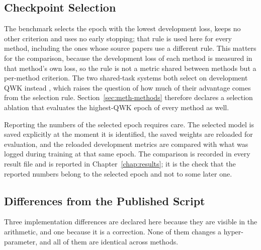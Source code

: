 \subsection{Checkpoint Selection}

The benchmark selects the epoch with the lowest development loss, keeps no other criterion and
uses no early stopping; that rule is used here for every method, including the ones whose
source papers use a different rule. This matters for the comparison, because the development
loss of each method is measured in that method's own loss, so the rule is not a metric shared
between methods but a per-method criterion. The two shared-task systems both select on
development QWK instead \cite{nazzal2025zai,trigui2025stbw}, which raises the question of how
much of their advantage comes from the selection rule. Section~\ref{sec:meth-methods} therefore
declares a selection ablation that evaluates the highest-QWK epoch of every method as well.

Reporting the numbers of the selected epoch requires care. The selected model is saved
explicitly at the moment it is identified, the saved weights are reloaded for evaluation, and
the reloaded development metrics are compared with what was logged during training at that same
epoch. The comparison is recorded in every result file and is reported in
Chapter~\ref{chap:results}; it is the check that the reported numbers belong to the selected
epoch and not to some later one.

\subsection{Differences from the Published Script}

Three implementation differences are declared here because they are visible in the arithmetic,
and one because it is a correction. None of them changes a hyper-parameter, and all of them are
identical across methods.

